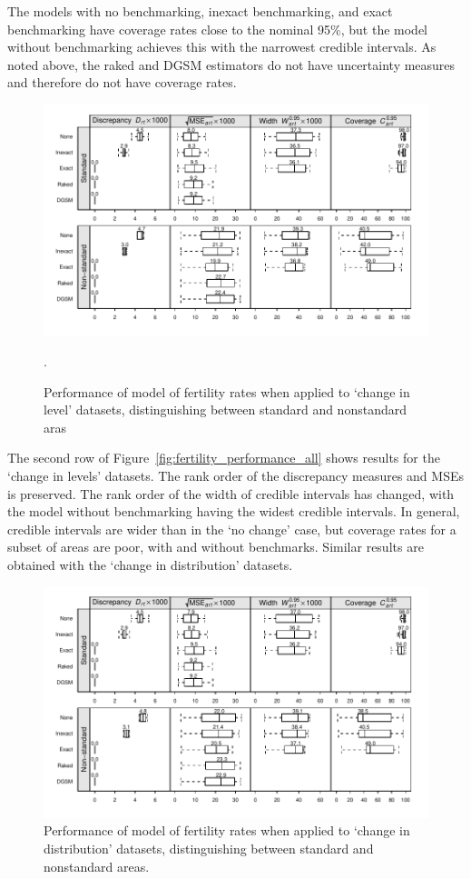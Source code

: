 \documentclass[12pt]{article}
\begin{document}
The models with no benchmarking, inexact benchmarking, and exact benchmarking have coverage rates close to the nominal 95\%, but the model without benchmarking achieves this with the narrowest credible intervals. As noted above, the raked and DGSM estimators do not have uncertainty measures and therefore do not have coverage rates.

\begin{figure}
   \centering
   \includegraphics{out/fertility/fertility_performance_level}
   \caption{\small Performance of model of fertility rates when applied to `change in level' datasets, distinguishing between standard and nonstandard aras}.
   \label{fig:fertility_performance_level}
 \end{figure}

The second row of Figure~\ref{fig:fertility_performance_all} shows results for the `change in levels' datasets. The rank order of the discrepancy measures and MSEs is preserved.  The rank order of the width of credible intervals has changed, with the model without benchmarking having the widest credible intervals. In general, credible intervals are wider than in the `no change' case, but coverage rates for a subset of areas are poor, with and without benchmarks.  Similar results are obtained with the `change in distribution' datasets.

 \begin{figure}
   \centering
   \includegraphics{out/fertility/fertility_performance_distn}
   \caption{\small Performance of model of fertility rates when applied to `change in distribution' datasets, distinguishing between standard and nonstandard areas.}
   \label{fig:fertility_performance_distn}
 \end{figure}
\end{document}
